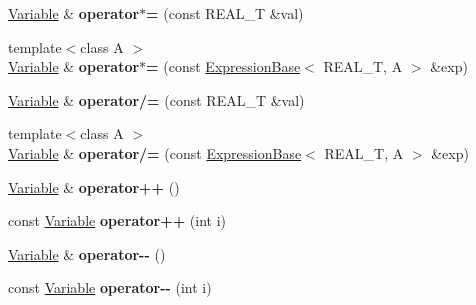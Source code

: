 \begin{DoxyCompactItemize}
\item 
\hypertarget{structatl_1_1_variable_a625c5a60771393a83e51bd605132987a}{\hyperlink{structatl_1_1_variable}{Variable} \& {\bfseries operator$\ast$=} (const R\+E\+A\+L\+\_\+\+T \&val)}\label{structatl_1_1_variable_a625c5a60771393a83e51bd605132987a}

\item 
\hypertarget{structatl_1_1_variable_abd8effad2f281d679c6cc4ad8d92bcb5}{{\footnotesize template$<$class A $>$ }\\\hyperlink{structatl_1_1_variable}{Variable} \& {\bfseries operator$\ast$=} (const \hyperlink{structatl_1_1_expression_base}{Expression\+Base}$<$ R\+E\+A\+L\+\_\+\+T, A $>$ \&exp)}\label{structatl_1_1_variable_abd8effad2f281d679c6cc4ad8d92bcb5}

\item 
\hypertarget{structatl_1_1_variable_afd5cf7762056c7157936b928f9d98007}{\hyperlink{structatl_1_1_variable}{Variable} \& {\bfseries operator/=} (const R\+E\+A\+L\+\_\+\+T \&val)}\label{structatl_1_1_variable_afd5cf7762056c7157936b928f9d98007}

\item 
\hypertarget{structatl_1_1_variable_a0d179dc181b83542633581994396b719}{{\footnotesize template$<$class A $>$ }\\\hyperlink{structatl_1_1_variable}{Variable} \& {\bfseries operator/=} (const \hyperlink{structatl_1_1_expression_base}{Expression\+Base}$<$ R\+E\+A\+L\+\_\+\+T, A $>$ \&exp)}\label{structatl_1_1_variable_a0d179dc181b83542633581994396b719}

\item 
\hypertarget{structatl_1_1_variable_ac0b77adb93d2f9cb6ba8f58ff7082c66}{\hyperlink{structatl_1_1_variable}{Variable} \& {\bfseries operator++} ()}\label{structatl_1_1_variable_ac0b77adb93d2f9cb6ba8f58ff7082c66}

\item 
\hypertarget{structatl_1_1_variable_aa48b49bfaa75a7eb17c26fe632c4bbbb}{const \hyperlink{structatl_1_1_variable}{Variable} {\bfseries operator++} (int i)}\label{structatl_1_1_variable_aa48b49bfaa75a7eb17c26fe632c4bbbb}

\item 
\hypertarget{structatl_1_1_variable_a9f5bfc096684109e36d3d397fad4b337}{\hyperlink{structatl_1_1_variable}{Variable} \& {\bfseries operator-\/-\/} ()}\label{structatl_1_1_variable_a9f5bfc096684109e36d3d397fad4b337}

\item 
\hypertarget{structatl_1_1_variable_ad54d90109a8d0242f291579581ed746b}{const \hyperlink{structatl_1_1_variable}{Variable} {\bfseries operator-\/-\/} (int i)}\label{structatl_1_1_variable_ad54d90109a8d0242f291579581ed746b}


\end{DoxyCompactItemize}
